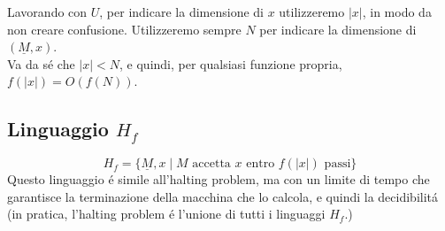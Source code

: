 Lavorando con $U$, per indicare la dimensione di $x$ utilizzeremo $|x|$,
 in modo da non creare confusione.
Utilizzeremo sempre $N$ per indicare la dimensione di $(\underline{M}, x)$. \\
Va da sé che $|x| < N$, e quindi, per qualsiasi funzione propria, $f(|x|) = O(f(N))$.

\subsection{Linguaggio $H_f$}
\[H_f = \{\underline{M}, x \mid M \text{ accetta } x \text{ entro } f(|x|) \text{ passi} \} \]
Questo linguaggio é simile all'halting problem, ma con un limite di tempo che garantisce la terminazione della macchina che lo calcola, e quindi la decidibilitá 
(in pratica, l'halting problem é l'unione di tutti i linguaggi $H_f$.)

\newpage
